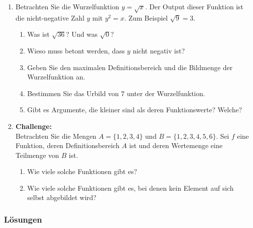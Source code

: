\begin{enumerate}
    \item Betrachten Sie die Wurzelfunktion \( y = \sqrt{x} \). Der Output dieser Funktion ist die nicht-negative Zahl \( y \) mit \( y^2 = x \). Zum Beispiel \( \sqrt{9} = 3 \).
          \begin{enumerate}[label=\alph*)]
              \item Was ist \( \sqrt{36} \)? Und was \( \sqrt{0} \)?
              \item Wieso muss betont werden, dass \( y \) nicht negativ ist?
              \item Geben Sie den maximalen Definitionsbereich und die Bildmenge der Wurzelfunktion an.
              \item Bestimmen Sie das Urbild von \(7\) unter der Wurzelfunktion.
              \item Gibt es Argumente, die kleiner sind als deren Funktionswerte? Welche?
          \end{enumerate}




    \item \textbf{Challenge:} \\
          Betrachten Sie die Mengen \( A = \{1, 2, 3, 4\} \) und \( B = \{1, 2, 3, 4, 5, 6\} \).
          Sei \( f \) eine Funktion, deren Definitionsbereich \( A \) ist und deren Wertemenge eine Teilmenge von \( B \) ist.
          \begin{enumerate}[label=\alph*)]
              \item Wie viele solche Funktionen gibt es?
              \item Wie viele solche Funktionen gibt es, bei denen kein Element auf sich selbst abgebildet wird?
          \end{enumerate}

\end{enumerate}
\newpage
\subsubsection{Lösungen}

